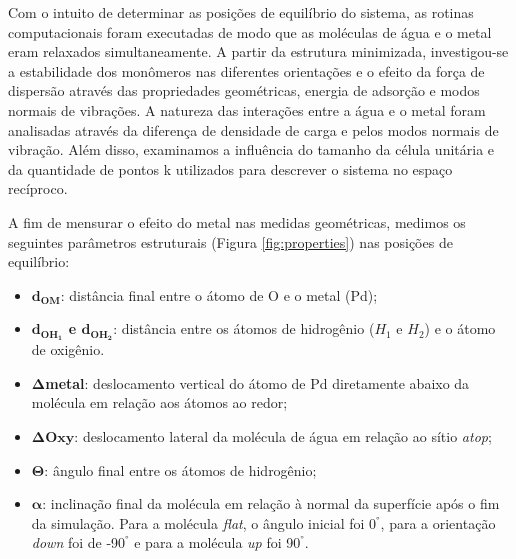  Com o intuito de determinar as posições de equilíbrio do sistema, as rotinas computacionais foram executadas de modo que as moléculas de água e o metal eram relaxados simultaneamente. A partir da estrutura minimizada, investigou-se a estabilidade dos monômeros nas diferentes orientações e o efeito da força de dispersão através das propriedades geométricas, energia de adsorção e modos normais de vibrações. A natureza das interações entre a água e o metal foram analisadas através da diferença de densidade de carga e pelos modos normais de vibração. Além disso, examinamos a influência do tamanho da célula unitária e da quantidade de pontos k utilizados para descrever o sistema no espaço recíproco.  

A fim de mensurar o efeito do metal nas medidas geométricas, medimos os seguintes parâmetros estruturais (Figura \ref{fig:properties}) nas posições de equilíbrio:

\begin{itemize}
\item \textbf{$ \pmb{d_{OM}} $}: distância final entre o átomo de O e o metal (Pd);
\item \textbf{$ \pmb{d_{OH_1}} $ e $ \pmb{d_{OH_2}} $}: distância entre os átomos de hidrogênio ($ H_1 $ e $H_2$) e o átomo de oxigênio.%
\item $\pmb{\Delta}$\textbf{metal}: deslocamento vertical do átomo de Pd diretamente abaixo da molécula em relação aos átomos ao redor;
\item $\pmb{\Delta Oxy}$: deslocamento lateral da molécula de água em relação ao sítio \textit{atop};
\item $\pmb{\Theta}$: ângulo final entre os átomos de hidrogênio;
\item $ \pmb{\alpha} $: inclinação final da molécula em relação à normal da superfície após o fim da simulação. Para a molécula \textit{flat}, o ângulo inicial foi 0$^{\si{\degree}}$, para a orientação \textit{down} foi de -90$^{\si{\degree}}$ e para a molécula \textit{up} foi 90$^{\si{\degree}}$.
\end{itemize}


